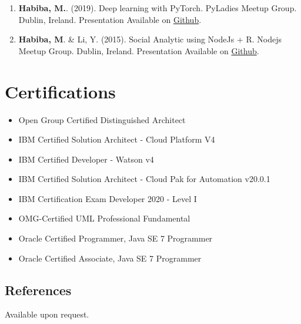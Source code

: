\documentclass[12pt,]{scrartcl}
\begin{document}
 \begin{enumerate}
  \leftskip-0.13in %
   \item \textbf{Habiba, M.}. (2019). Deep learning with PyTorch. PyLadies Meetup Group. Dublin, Ireland. Presentation Available on \href{https://github.com/mansura-habiba/meetup/tree/master/PyLadies_Dublin_2019}{Github}.
   \item \textbf{Habiba, M}. \& Li, Y. (2015). Social Analytic using NodeJs + R. Nodejs Meetup Group. Dublin, Ireland. Presentation Available on \href{https://github.com/mansura-habiba/meetup/blob/master/Nodejs_meetup_dublin.pptx}{Github}.
\end{enumerate}




\section*{Certifications}
\begin{itemize}
    \item Open Group Certified Distinguished Architect
    \item IBM Certified Solution Architect - Cloud Platform V4
    \item IBM Certified Developer - Watson v4
    \item IBM Certified Solution Architect - Cloud Pak for Automation v20.0.1
    \item IBM Certification Exam Developer 2020 - Level I
    \item OMG-Certified UML Professional Fundamental
    \item Oracle Certified Programmer, Java SE 7 Programmer
    \item Oracle Certified Associate, Java SE 7 Programmer
\end{itemize}    

\subsection{References}
Available upon request.
\end{document}
